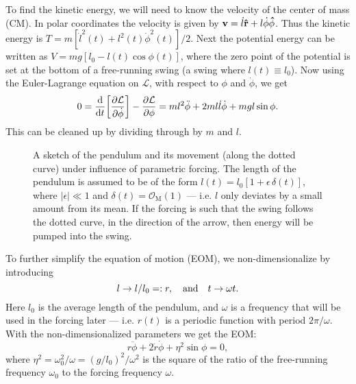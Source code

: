 To find the kinetic energy, we will need to know the velocity of the
center of mass (CM). 
In polar coordinates the velocity is given by
$\vb{v}=\dot{l}\vu{r}+l\dot{\phi}\vu{\phi}$. Thus the kinetic energy is
$T=m[\dot{l}^2(t)+l^2(t)\dot{\phi}^2(t)]/2$.
Next the potential energy can be written as
$V=mg[l_0-l(t)\cos\phi(t)]$,
where the zero point of the potential is set at the bottom of a
free-running swing (a swing where $l(t)\equiv l_0$). 
Now using the Euler-Lagrange equation on $\mathcal{L}$, with
respect to $\phi$ and $\dot\phi$, we get 
\begin{equation}
0=\dv{t}\qty[\pdv{\mathcal{L}}{\dot{\phi}}]-\pdv{\mathcal{L}}{\phi}
=ml^2\ddot\phi +2ml\dot{l}\dot\phi +mgl\sin\phi.
\end{equation}
This can be cleaned up by dividing through by $m$ and $l$. 

\begin{figure}\centering
\resizebox{.2\textwidth}{!}{}
\caption{A sketch of the pendulum and its movement (along the dotted
  curve) under influence of parametric forcing. The length of the
  pendulum is assumed to be of the form
  $l(t)=l_0[1+\epsilon\,\delta(t)]$, where $|\epsilon|\ll1$ and
  $\delta(t)=\mathcal{O}_\text{M}(1)$  --- i.e. $l$ only deviates by a
  small amount from its mean. If the forcing is such that the swing
  follows the dotted curve, in the direction of the arrow, then energy
  will be pumped into the swing.
}
\label{fig:pendulum}
\end{figure}



To further simplify the equation of motion (EOM), we
non-dimensionalize by introducing
\begin{equation}\label{eq:non-dim}
l\to {l}/{l_0}=:r\qcomma\text{and}\quad
t\to\omega t.
\end{equation}
Here $l_0$ is the average length of the pendulum, and $\omega$ is a
frequency that will be used in the forcing later --- i.e. $r(t)$ is a
periodic function with period $2\pi/\omega$. 
With the non-dimensionalized parameters we get the EOM:
\begin{equation}\label{eq:eom}
r\ddot\phi+2\dot{r}\dot\phi + \eta^2\sin\phi=0,
\end{equation}
where %
$\eta^2=\omega_0^2/\omega=(g/l_0)^2/\omega^2$ is the square of the
ratio of the free-running frequency $\omega_0$ to the forcing
frequency $\omega$. 



